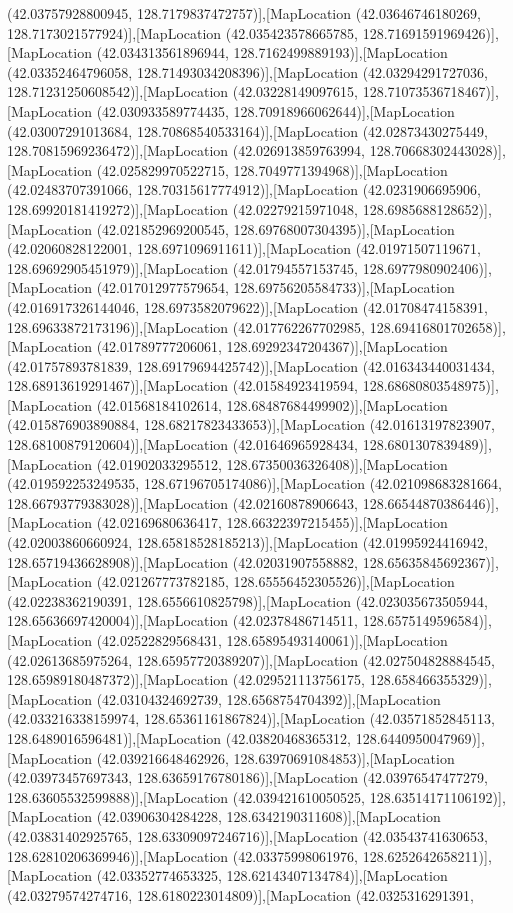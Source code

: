(42.03757928800945, 128.7179837472757)],[MapLocation (42.03646746180269, 128.7173021577924)],[MapLocation (42.035423578665785, 128.71691591969426)],[MapLocation (42.034313561896944, 128.7162499889193)],[MapLocation (42.03352464796058, 128.71493034208396)],[MapLocation (42.03294291727036, 128.71231250608542)],[MapLocation (42.03228149097615, 128.71073536718467)],[MapLocation (42.030933589774435, 128.70918966062644)],[MapLocation (42.03007291013684, 128.70868540533164)],[MapLocation (42.02873430275449, 128.70815969236472)],[MapLocation (42.026913859763994, 128.70668302443028)],[MapLocation (42.025829970522715, 128.7049771394968)],[MapLocation (42.02483707391066, 128.70315617774912)],[MapLocation (42.0231906695906, 128.69920181419272)],[MapLocation (42.02279215971048, 128.6985688128652)],[MapLocation (42.021852969200545, 128.69768007304395)],[MapLocation (42.02060828122001, 128.6971096911611)],[MapLocation (42.01971507119671, 128.69692905451979)],[MapLocation (42.01794557153745, 128.6977980902406)],[MapLocation (42.017012977579654, 128.69756205584733)],[MapLocation (42.016917326144046, 128.6973582079622)],[MapLocation (42.01708474158391, 128.69633872173196)],[MapLocation (42.017762267702985, 128.69416801702658)],[MapLocation (42.01789777206061, 128.69292347204367)],[MapLocation (42.01757893781839, 128.69179694425742)],[MapLocation (42.016343440031434, 128.68913619291467)],[MapLocation (42.01584923419594, 128.68680803548975)],[MapLocation (42.01568184102614, 128.68487684499902)],[MapLocation (42.015876903890884, 128.68217823433653)],[MapLocation (42.01613197823907, 128.68100879120604)],[MapLocation (42.01646965928434, 128.6801307839489)],[MapLocation (42.01902033295512, 128.67350036326408)],[MapLocation (42.019592253249535, 128.67196705174086)],[MapLocation (42.021098683281664, 128.66793779383028)],[MapLocation (42.02160878906643, 128.66544870386446)],[MapLocation (42.02169680636417, 128.66322397215455)],[MapLocation (42.02003860660924, 128.65818528185213)],[MapLocation (42.01995924416942, 128.65719436628908)],[MapLocation (42.02031907558882, 128.65635845692367)],[MapLocation (42.021267773782185, 128.65556452305526)],[MapLocation (42.02238362190391, 128.6556610825798)],[MapLocation (42.023035673505944, 128.65636697420004)],[MapLocation (42.02378486714511, 128.6575149596584)],[MapLocation (42.02522829568431, 128.65895493140061)],[MapLocation (42.02613685975264, 128.65957720389207)],[MapLocation (42.027504828884545, 128.65989180487372)],[MapLocation (42.029521113756175, 128.658466355329)],[MapLocation (42.03104324692739, 128.6568754704392)],[MapLocation (42.033216338159974, 128.65361161867824)],[MapLocation (42.03571852845113, 128.6489016596481)],[MapLocation (42.03820468365312, 128.6440950047969)],[MapLocation (42.039216648462926, 128.63970691084853)],[MapLocation (42.03973457697343, 128.63659176780186)],[MapLocation (42.03976547477279, 128.63605532599888)],[MapLocation (42.039421610050525, 128.63514171106192)],[MapLocation (42.03906304284228, 128.6342190311608)],[MapLocation (42.03831402925765, 128.63309097246716)],[MapLocation (42.03543741630653, 128.62810206369946)],[MapLocation (42.03375998061976, 128.6252642658211)],[MapLocation (42.03352774653325, 128.62143407134784)],[MapLocation (42.03279574274716, 128.6180223014809)],[MapLocation (42.0325316291391, 